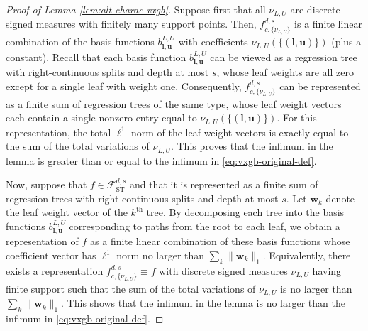 \documentclass[10pt]{article}
\newcommand{\fst}{{\mathcal{F}^{d, s}_{\text{ST}}}}
\newcommand{\fcnu}{{f^{d, s}_{c, \{\nu_{L, U}\}}}}
\newcommand{\wbf}{{\mathbf{w}}}
\newcommand{\lbf}{{\mathbf{l}}}
\newcommand{\ubf}{{\mathbf{u}}}
\begin{document}
\begin{proof}[Proof of Lemma \ref{lem:alt-charac-vxgb}]
Suppose first that all $\nu_{L, U}$ are discrete signed measures with 
finitely many support points. Then, $\fcnu$ is a finite linear 
combination of the basis functions $b^{L, U}_{\lbf, \ubf}$ with 
coefficients $\nu_{L, U}(\{(\lbf, \ubf)\})$ (plus a constant). Recall 
that each basis function $b^{L, U}_{\lbf, \ubf}$ can be viewed as a 
regression tree with right-continuous splits and depth at most $s$, 
whose leaf weights are all zero except for a single leaf with weight one. 
Consequently, $\fcnu$ can be represented as a finite sum of regression 
trees of the same type, whose leaf weight vectors each contain a single 
nonzero entry equal to $\nu_{L, U}(\{(\lbf, \ubf)\})$. For this 
representation, the total $\ell^1$ norm of the leaf weight vectors is 
exactly equal to the sum of the total variations of $\nu_{L, U}$. This 
proves that the infimum in the lemma is greater than or equal to the 
infimum in \eqref{eq:vxgb-original-def}. 

Now, suppose that $f \in \fst$ and that it is represented as a finite sum of 
regression trees with right-continuous splits and depth at most $s$. Let 
$\wbf_k$ denote the leaf weight vector of the $k^{\text{th}}$ tree. 
By decomposing each tree into the basis functions $b^{L, U}_{\lbf, \ubf}$ 
corresponding to paths from the root to each leaf, we obtain a 
representation of $f$ as a finite linear combination of these basis 
functions whose coefficient vector has $\ell^1$ norm no larger than 
$\sum_k \|\wbf_k\|_1$. Equivalently, there exists a representation 
$\fcnu \equiv f$ with discrete signed measures $\nu_{L, U}$ having finite 
support such that the sum of the total variations of $\nu_{L, U}$ is no 
larger than $\sum_k \|\wbf_k\|_1$. This shows that the infimum in 
the lemma is no larger than the infimum in \eqref{eq:vxgb-original-def}.
\end{proof}
\end{document}

